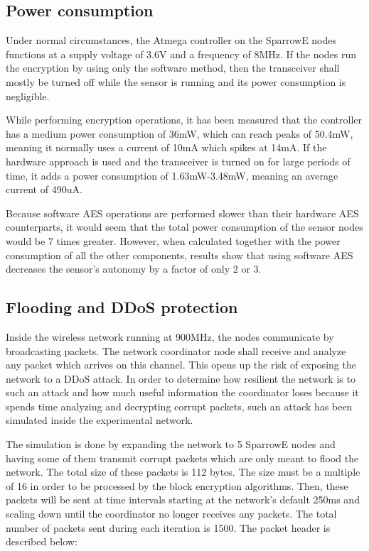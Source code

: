 \subsection{Power consumption}

Under normal circumstances, the Atmega controller on the SparrowE nodes functions at a 
supply voltage of 3.6V and a frequency of 8MHz. If the nodes run the encryption by using 
only the software method, then the transceiver shall mostly be turned off while the sensor is 
running and its power consumption is negligible.

While performing encryption operations, it has been measured that the controller has a medium 
power consumption of 36mW, which can reach peaks of 50.4mW, meaning it normally uses a current 
of 10mA which spikes at 14mA. If the hardware approach is used and the transceiver is turned on 
for large periods of time, it adds a power consumption of 1.63mW-3.48mW, meaning an average 
current of 490uA.

Because software AES operations are performed slower than their hardware AES counterparts, 
it would seem that the total power consumption of the sensor nodes would be 7 times greater.
However, when calculated together with the power consumption of all the other components, 
results show that using software AES decreases the sensor's autonomy by a factor of only 
2 or 3.

\subsection{Flooding and DDoS protection}

Inside the wireless network running at 900MHz, the nodes communicate by broadcasting packets.
The network coordinator node shall receive and analyze any packet which arrives on this channel.
This opens up the risk of exposing the network to a DDoS attack. In order to determine how 
resilient the network is to such an attack and how much useful information the coordinator 
loses because it spends time analyzing and decrypting corrupt packets, such an attack has been 
simulated inside the experimental network.

The simulation is done by expanding the network to 5 SparrowE nodes and having some of them transmit 
corrupt packets which are only meant to flood the network. The total size of these packets is 
112 bytes. The size must be a multiple of 16 in order to be processed by the block encryption 
algorithms. Then, these packets will be sent at time intervals starting at the network's default 
250ms and scaling down until the coordinator no longer receives any packets. The total number 
of packets sent during each iteration is 1500. The packet header is described below:

